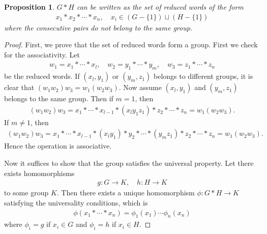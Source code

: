 \documentclass[12pt]{report}
\theoremstyle{plain}
\newtheorem{proposition}[theorem]{Proposition}
\theoremstyle{remark}
\theoremstyle{definition}
\begin{document}
\begin{proposition}
    $G*H$ can be written as the set of reduced words of the form
    \begin{align*}
        x_1*x_2*\cdots*x_n,\quad x_i \in (G-\{1\})\sqcup (H-\{1\})
    \end{align*}
    where the consecutive pairs do not belong to the same group.
\end{proposition}
\begin{proof}
    First, we prove that the set of reduced words form a group. First we check for the associativity. Let
    \begin{align*}
        w_1 = x_1*\cdots * x_l,\quad w_2=y_1*\cdots * y_m,\quad w_3 = z_1*\cdots * z_n
    \end{align*}
    be the reduced words. If $(x_l,y_1)$ or $(y_m,z_1)$ belongs to different groups, it is clear that $(w_1w_2)w_3 = w_1(w_2w_3)$. Now assume $(x_l,y_1)$ and $(y_m,z_1)$ belongs to the same group. Then if $m=1$, then
    \begin{align*}
        (w_1w_2)w_3 = x_1 * \cdots * x_{l-1} * (x_ly_1z_1) * z_2*\cdots*z_n = w_1(w_2w_3).
    \end{align*}
    If $m\neq 1$, then
    \begin{align*}
        (w_1w_2)w_3 = x_1 * \cdots * x_{l-1} * (x_ly_1) * y_2 * \cdots * (y_mz_1) * z_2*\cdots*z_n = w_1(w_2w_3).
    \end{align*}
    Hence the operation is associative.
    
    Now it suffices to show that the group satisfies the universal property. Let there exists homomorphisms
    \begin{align*}
        g:G\rightarrow K,\quad h:H\rightarrow K
    \end{align*}
    to some group $K$. Then there exists a unique homomorphism $\phi:G*H\rightarrow K$ satisfying the universality conditions, which is
    \begin{align*}
        \phi(x_1*\cdots * x_n) = \phi_1(x_1)\cdots \phi_n(x_n)
    \end{align*}
    where $\phi_i=g$ if $x_i\in G$ and $\phi_i=h$ if $x_i\in H$.
\end{proof}
\end{document}
